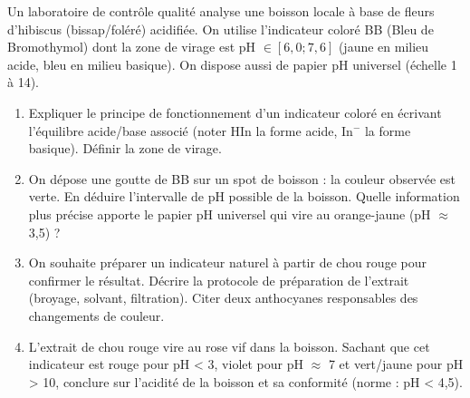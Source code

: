 \documentclass[11pt]{article}
\begin{document}
\begin{exercice}
Un laboratoire de contrôle qualité analyse une boisson locale à base de fleurs d'hibiscus (bissap/foléré) acidifiée. On utilise l'indicateur coloré BB (Bleu de Bromothymol) dont la zone de virage est pH $\in [6,0 ; 7,6]$ (jaune en milieu acide, bleu en milieu basique). On dispose aussi de papier pH universel (échelle 1 à 14).

\begin{enumerate}
    \item Expliquer le principe de fonctionnement d'un indicateur coloré en écrivant l'équilibre acide/base associé (noter HIn la forme acide, In$^-$ la forme basique). Définir la zone de virage.
    \item On dépose une goutte de BB sur un spot de boisson : la couleur observée est verte. En déduire l'intervalle de pH possible de la boisson. Quelle information plus précise apporte le papier pH universel qui vire au orange-jaune (pH $\approx$ 3,5) ?
    \item On souhaite préparer un indicateur naturel à partir de chou rouge pour confirmer le résultat. Décrire la protocole de préparation de l'extrait (broyage, solvant, filtration). Citer deux anthocyanes responsables des changements de couleur.
    \item L'extrait de chou rouge vire au rose vif dans la boisson. Sachant que cet indicateur est rouge pour pH < 3, violet pour pH $\approx$ 7 et vert/jaune pour pH > 10, conclure sur l'acidité de la boisson et sa conformité (norme : pH < 4,5).
\end{enumerate}
\end{exercice}
\end{document}
